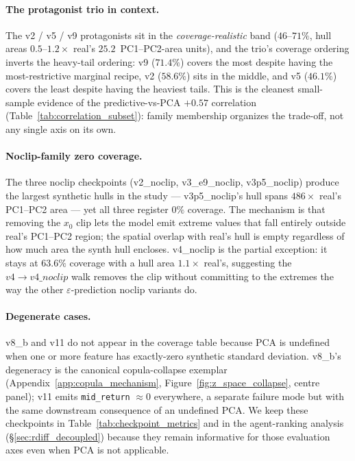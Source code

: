 \documentclass[journal]{IEEEtran}
\newcommand{\eps}{\varepsilon}
\theoremstyle{definition}   %
\begin{document}
\paragraph{The protagonist trio in context.}
The v2 / v5 / v9 protagonists sit in the
\emph{coverage-realistic} band ($46$--$71\%$, hull areas
$0.5$--$1.2\times$ real's $25.2$~PC1--PC2-area units), and the
trio's coverage ordering inverts the heavy-tail ordering: v9
($71.4\%$) covers the most despite having the most-restrictive
marginal recipe, v2 ($58.6\%$) sits in the middle, and v5
($46.1\%$) covers the least despite having the heaviest tails.
This is the cleanest small-sample evidence of the
predictive-vs-PCA $+0.57$ correlation
(Table~\ref{tab:correlation_subset}): family membership organizes
the trade-off, not any single axis on its own.

\paragraph{Noclip-family zero coverage.}
The three noclip checkpoints (v2\_noclip, v3\_e9\_noclip,
v3p5\_noclip) produce the largest synthetic hulls in the study
--- v3p5\_noclip's hull spans $486\times$ real's
PC1--PC2 area --- yet all three register $0\%$ coverage. The
mechanism is that removing the $x_0$ clip lets the model emit
extreme values that fall entirely outside real's PC1--PC2 region;
the spatial overlap with real's hull is empty regardless of how
much area the synth hull encloses. v4\_noclip is the partial
exception: it stays at $63.6\%$ coverage with a hull area
$1.1\times$ real's, suggesting the $v4 \to v4\_noclip$ walk
removes the clip without committing to the extremes the way the
other $\eps$-prediction noclip variants do.

\paragraph{Degenerate cases.}
v8\_b and v11 do not appear in the coverage table because PCA is
undefined when one or more feature has exactly-zero synthetic
standard deviation. v8\_b's degeneracy is the canonical
copula-collapse exemplar (Appendix~\ref{app:copula_mechanism},
Figure~\ref{fig:z_space_collapse}, centre panel); v11 emits
\texttt{mid\_return} $\approx 0$ everywhere, a separate failure
mode but with the same downstream consequence of an undefined
PCA. We keep these checkpoints in
Table~\ref{tab:checkpoint_metrics} and in the agent-ranking
analysis (\S\ref{sec:rdiff_decoupled}) because they remain
informative for those evaluation axes even when PCA is not
applicable.
\end{document}
